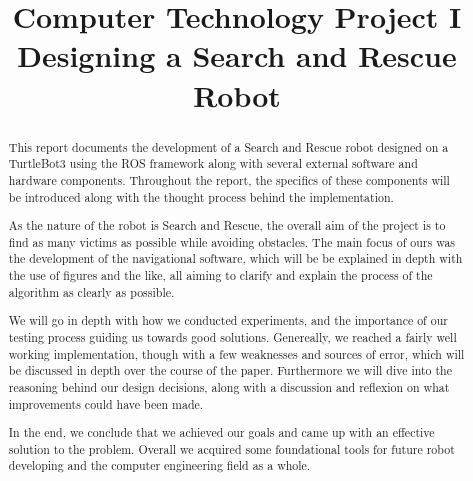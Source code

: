 \documentclass[conference]{IEEEtran}
\begin{document}
\title{Computer Technology Project I\\ {\LARGE Designing a Search and Rescue Robot}}

\author{
\and
{}
}

\maketitle

\begin{abstract}
    This report documents the development of a Search and Rescue robot designed on a TurtleBot3 using the ROS framework along with several external software and hardware components.
    Throughout the report, the specifics of these components will be introduced along with the thought process behind the implementation.

    As the nature of the robot is Search and Rescue, the overall aim of the project is to find as many victims as possible while avoiding obstacles.
    The main focus of ours was the development of the navigational software, which will be be explained in depth with the use of figures and the like, all aiming to clarify and explain the process of the algorithm as clearly as possible.
    
    We will go in depth with how we conducted experiments, and the importance of our testing process guiding us towards good solutions.
    Genereally, we reached a fairly well working implementation, though with a few weaknesses and sources of error, which will be discussed in depth over the course of the paper.
    Furthermore we will dive into the reasoning behind our design decisions, along with a discussion and reflexion on what improvements could have been made.

    In the end, we conclude that we achieved our goals and came up with an effective solution to the problem.
    Overall we acquired some foundational tools for future robot developing and the computer engineering field as a whole.
\end{abstract}
\end{document}
